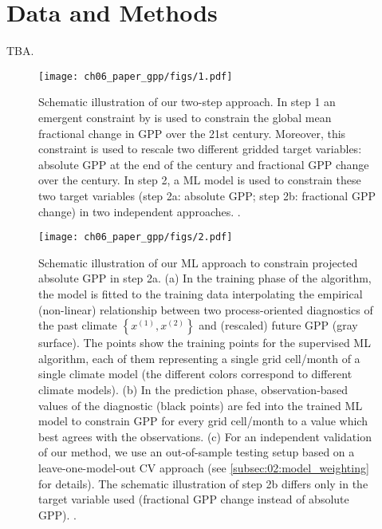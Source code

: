 \section{Data and Methods}
\label{sec:06:data_and_methods}

TBA.

\begin{figure}[t]
  \centering
  \texttt{[image: ch06\_paper\_gpp/figs/1.pdf]}
  \caption{Schematic illustration of our two-step approach. In step 1 an
    emergent constraint by \textcite{Wenzel2016} is used to constrain the
    global mean fractional change in \acf{GPP} over the 21st century.
    Moreover, this constraint is used to rescale two different gridded target
    variables: absolute \acs{GPP} at the end of the  century and
    fractional \acs{GPP} change over the  century. In step 2, a
    \acl{ML} model is used to constrain these two target variables (step 2a:
    absolute \acs{GPP}; step 2b: fractional \acs{GPP} change) in two
    independent approaches. .}
  \label{fig:06:schematic_steps}
\end{figure}

\begin{figure}[p]
  \centering
  \texttt{[image: ch06\_paper\_gpp/figs/2.pdf]}
  \caption{Schematic illustration of our \acf{ML} approach to constrain
    projected absolute \acf{GPP} in step 2a. (a) In the training phase of the
    algorithm, the model is fitted to the training data interpolating the
    empirical (non-linear) relationship between two process-oriented
    diagnostics of the past climate $\left\{ x^{(1)}, x^{(2)} \right\}$ and
    (rescaled) future \acs{GPP} (gray surface). The points show the training
    points for the supervised \acs{ML} algorithm, each of them representing a
    single grid cell/month of a single climate model (the different colors
    correspond to different climate models). (b) In the prediction phase,
    observation-based values of the diagnostic (black points) are fed into the
    trained \acs{ML} model to constrain \acs{GPP} for every grid cell/month to
    a value which best agrees with the observations. (c) For an independent
    validation of our method, we use an out-of-sample testing setup based on a
    leave-one-model-out \acl{CV} approach (see
    \cref{subsec:02:model_weighting} for details). The schematic illustration
    of step 2b differs only in the target variable used (fractional \acs{GPP}
    change instead of absolute \acs{GPP}). .}
  \label{fig:06:mlr_concept}
\end{figure}



